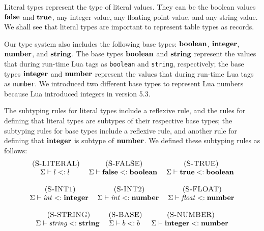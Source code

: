 Literal types represent the type of literal values.
They can be the boolean values $\mathbf{false}$ and $\mathbf{true}$,
any integer value, any floating point value, and any string value.
We shall see that literal types are important to represent table types
as records.

Our type system also includes the following base types: $\mathbf{boolean}$,
$\mathbf{integer}$, $\mathbf{number}$, and $\mathbf{string}$.
The base types $\mathbf{boolean}$ and $\mathbf{string}$ represent the values that
during run-time Lua tags as \texttt{boolean} and \texttt{string},
respectively;
the base types $\mathbf{integer}$ and $\mathbf{number}$ represent the values
that during run-time Lua tags as \texttt{number}.
We introduced two different base types to represent Lua numbers
because Lua introduced integers in version 5.3.

The subtyping rules for literal types include a reflexive rule,
and the rules for defining that literal types are subtypes of
their respective base types;
the subtyping rules for base types include a reflexive rule,
and another rule for defining that $\mathbf{integer}$ is subtype of
$\mathbf{number}$.
We defined these subtyping rules as follows:
\[
\begin{array}{c}
\begin{array}{c}
\; (\textsc{S-LITERAL})\\
\Sigma \vdash l <: l
\end{array}
\;
\begin{array}{c}
\; (\textsc{S-FALSE})\\
\Sigma \vdash \mathbf{false} <: \mathbf{boolean}
\end{array}
\;
\begin{array}{c}
\; (\textsc{S-TRUE})\\
\Sigma \vdash \mathbf{true} <: \mathbf{boolean}
\end{array}
\\ \\
\begin{array}{c}
\; (\textsc{S-INT1})\\
\Sigma \vdash {\it int} <: \mathbf{integer}
\end{array}
\;
\begin{array}{c}
\; (\textsc{S-INT2})\\
\Sigma \vdash {\it int} <: \mathbf{number}
\end{array}
\;
\begin{array}{c}
\; (\textsc{S-FLOAT})\\
\Sigma \vdash {\it float} <: \mathbf{number}
\end{array}
\\ \\
\begin{array}{c}
\; (\textsc{S-STRING})\\
\Sigma \vdash {\it string} <: \mathbf{string}
\end{array}
\begin{array}{c}
\; (\textsc{S-BASE})\\
\Sigma \vdash b <: b
\end{array}
\;
\begin{array}{c}
\; (\textsc{S-NUMBER})\\
\Sigma \vdash \mathbf{integer} <: \mathbf{number}
\end{array}
\end{array}
\]

